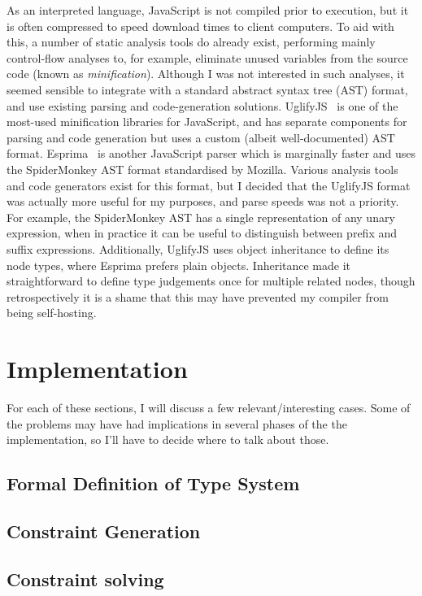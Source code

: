 \documentclass[12pt,a4paper,twoside,openright]{report}
\begin{document}
As an interpreted language, JavaScript is not compiled prior to execution, but
it is often compressed to speed download times to client computers. To aid with
this, a number of static analysis tools do already exist, performing mainly
control-flow analyses to, for example, eliminate unused variables from the
source code (known as \textit{minification}). Although I was not interested in
such analyses, it seemed sensible to integrate with a standard abstract syntax
tree (AST) format, and use existing parsing and code-generation solutions.
UglifyJS~\cite{uglify} is one of the most-used minification libraries for
JavaScript, and has separate components for parsing and code generation but
uses a custom (albeit well-documented) AST format. Esprima~\cite{esprima} is
another JavaScript parser which is marginally faster and uses the SpiderMonkey
AST format standardised by Mozilla. Various analysis tools and code generators
exist for this format, but I decided that the UglifyJS format was actually more
useful for my purposes, and parse speeds was not a priority. For example, the
SpiderMonkey AST has a single representation of any unary expression, when in
practice it can be useful to distinguish between prefix and suffix expressions.
Additionally, UglifyJS uses object inheritance to define its node types, where
Esprima prefers plain objects. Inheritance made it straightforward to define
type judgements once for multiple related nodes, though retrospectively it is a
shame that this may have prevented my compiler from being self-hosting.

\chapter{Implementation}\label{implementation}

For each of these sections, I will discuss a few relevant/interesting
cases. Some of the problems may have had implications in several
phases of the the implementation, so I'll have to decide where to talk
about those. 


\section{Formal Definition of Type System}
\section{Constraint Generation}
\section{Constraint solving}
\end{document}

